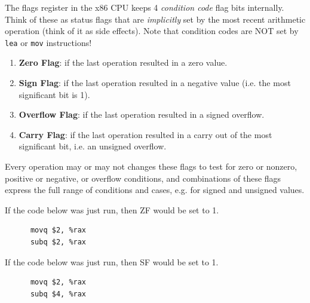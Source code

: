   \begin{definition}
    \label{def:condition-code-flags}
    The flags register in the x86 CPU keeps 4 \textit{condition code} flag bits internally. Think of these as status flags that are \textit{implicitly} set by the most recent arithmetic operation (think of it as side effects). Note that condition codes are NOT set by \texttt{lea} or \texttt{mov} instructions! 
    \begin{enumerate}
      \item \textbf{Zero Flag}: if the last operation resulted in a zero value.
      \item \textbf{Sign Flag}: if the last operation resulted in a negative value (i.e. the most significant bit is 1).
      \item \textbf{Overflow Flag}: if the last operation resulted in a signed overflow.
      \item \textbf{Carry Flag}: if the last operation resulted in a carry out of the most significant bit, i.e. an unsigned overflow. 
    \end{enumerate}
    Every operation may or may not changes these flags to test for zero or nonzero, positive or negative, or overflow conditions, and combinations of these flags express the full range of conditions and cases, e.g. for signed and unsigned values. 
  \end{definition}

  \begin{example}
    \label{ex:zero-flag}
    If the code below was just run, then ZF would be set to 1. 
    \begin{lstlisting}
      movq $2, %rax 
      subq $2, %rax
    \end{lstlisting}
  \end{example}

  \begin{example}
    \label{ex:sign-flag}
    If the code below was just run, then SF would be set to 1. 
    \begin{lstlisting}
      movq $2, %rax 
      subq $4, %rax
    \end{lstlisting}
  \end{example}

